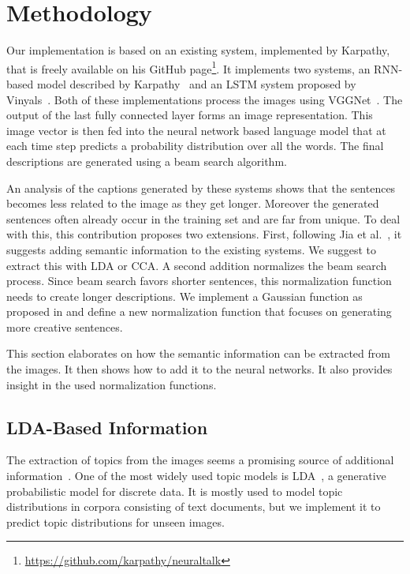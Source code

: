 \documentclass[twoside,twocolumn]{article}
\begin{document}
	\section{Methodology}
	\label{sec:methodology}
	Our implementation is based on an existing system, implemented by Karpathy, that is freely available on his GitHub page\footnote{\url{https://github.com/karpathy/neuraltalk}}. It implements two systems, an RNN-based model described by Karpathy~\cite{Karpathy2015} and an LSTM system proposed by Vinyals~\cite{Google}. Both of these implementations process the images using VGGNet~\cite{Arge2015}. The output of the last fully connected layer forms an image representation. This image vector is then fed into the neural network based language model that at each time step predicts a probability distribution over all the words. The final descriptions are generated using a beam search algorithm.
	
	An analysis of the captions generated by these systems shows that the sentences becomes less related to the image as they get longer. Moreover the generated sentences often already occur in the training set and are far from unique. To deal with this, this contribution proposes two extensions. First, following Jia et al.~\cite{Fernando2015}, it suggests adding semantic information to the existing systems. We suggest to extract this with LDA or CCA. A second addition normalizes the beam search process. Since beam search favors shorter sentences, this normalization function needs to create longer descriptions. We implement a Gaussian function as proposed in \cite{Fernando2015} and define a new normalization function that focuses on generating more creative sentences.
	
	This section elaborates on how the semantic information can be extracted from the images. It then shows how to add it to the neural networks. It also provides insight in the used normalization functions. 
	
	
	
	\subsection{LDA-Based Information}
	\label{sec:LDAinfo}
	The extraction of topics from the images seems a promising source of additional information~\cite{Jin2015}. One of the most widely used topic models is LDA~\cite{Blei2012}, a generative probabilistic model for discrete data. It is mostly used to model topic distributions in corpora consisting of text documents, but we implement it to predict topic distributions for unseen images.
	
\end{document}
